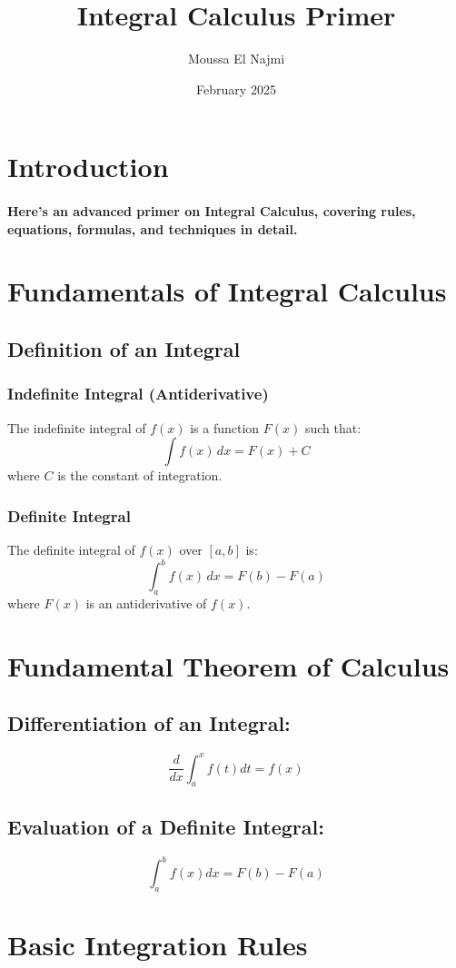 \documentclass{article}
\title{Integral Calculus Primer}
\author{Moussa El Najmi}
\date{February 2025}
\begin{document}
\maketitle
\section{Introduction}
\paragraph{Here’s an advanced primer on Integral Calculus, covering rules, equations, formulas, and techniques in detail.}
\newpage
\section{Fundamentals of Integral Calculus}
\subsection{Definition of an Integral}
\subsubsection{Indefinite Integral (Antiderivative)}
The indefinite integral of \( f(x) \) is a function \( F(x) \) such that:
\[
\int f(x) \, dx = F(x) + C
\]
where \( C \) is the constant of integration.
\subsubsection{Definite Integral}
The definite integral of \( f(x) \) over \( [a, b] \) is:
\[
\int_a^b f(x) \, dx = F(b) - F(a)
\]
where \( F(x) \) is an antiderivative of \( f(x) \).
\newpage
\section{Fundamental Theorem of Calculus}
\subsection{Differentiation of an Integral:}
   \[
   \frac{d}{dx} \int_a^x f(t) dt = f(x)
   \]
\subsection{Evaluation of a Definite Integral:}
   \[
   \int_a^b f(x) dx = F(b) - F(a)
   \]
\newpage
\section{Basic Integration Rules}
\end{document}
